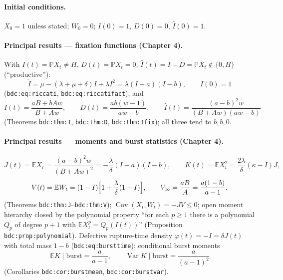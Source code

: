 \documentclass[11pt,a4paper]{article}
\newcommand{\PR}{\mathbb{P}}
\newcommand{\EX}{\mathbb{E}}
\newcommand{\Var}{\operatorname{Var}}
\newcommand{\Cov}{\operatorname{Cov}}
\begin{document}
\paragraph{Initial conditions.} $X_0=1$ unless stated; $W_0=0$;
$I(0)=1$, $D(0)=0$, $\hat I(0)=1$.

\paragraph{Principal results --- fixation functions (Chapter 4).}
With $I(t)=\PR{X_t\ne H}$, $D(t)=\PR{X_t=0}$,
$\hat I(t)=I-D=\PR{X_t\notin\{0,H\}}$ (``productive''):
\[
\dot I=\mu-(\lambda+\mu+\delta)I+\lambda I^2=\lambda(I-a)(I-b),\qquad I(0)=1
\]
(\texttt{bdc:eq:riccati}, \texttt{bdc:eq:riccatifact}), and
\[
I(t)=\frac{aB+bAw}{B+Aw},\qquad
D(t)=\frac{ab(w-1)}{aw-b},\qquad
\hat I(t)=\frac{(a-b)^2w}{(B+Aw)(aw-b)}
\]
(Theorems \texttt{bdc:thm:I}, \texttt{bdc:thm:D}, \texttt{bdc:thm:Ifix});
all three tend to $b,b,0$.

\paragraph{Principal results --- moments and burst statistics (Chapter 4).}
\[
J(t)=\EX{X_t}=\frac{(a-b)^2w}{(B+Aw)^2}=-\frac{\lambda}{\delta}(I-a)(I-b),
\qquad
K(t)=\EX{X_t^2}=\frac{2\lambda}{\delta}(\kappa-I)J,
\]
\[
V(t)=\EX{W_t}=(1-I)\Bigl[1+\frac{\lambda}{\delta}(1-I)\Bigr],\qquad
V_\infty=\frac{aB}{A}=\frac{a(1-b)}{a-1},
\]
(Theorems \texttt{bdc:thm:J}--\texttt{bdc:thm:V}); $\Cov(X_t,W_t)=-JV\le0$;
open moment hierarchy closed by the polynomial property ``for each $p\ge1$
there is a polynomial $Q_p$ of degree $p+1$ with $\EX{X_t^p}=Q_p(I(t))$''
(Proposition \texttt{bdc:prop:polynomial}). Defective rupture-time density
$\varphi(t)=-\dot I=\delta J(t)$ with total mass $1-b$
(\texttt{bdc:eq:bursttime}); conditional burst moments
\[
\EX{K\mid\text{burst}}=\frac{a}{a-1},\qquad
\Var{K\mid\text{burst}}=\frac{a}{(a-1)^2}
\]
(Corollaries \texttt{bdc:cor:burstmean}, \texttt{bdc:cor:burstvar}).
\end{document}
